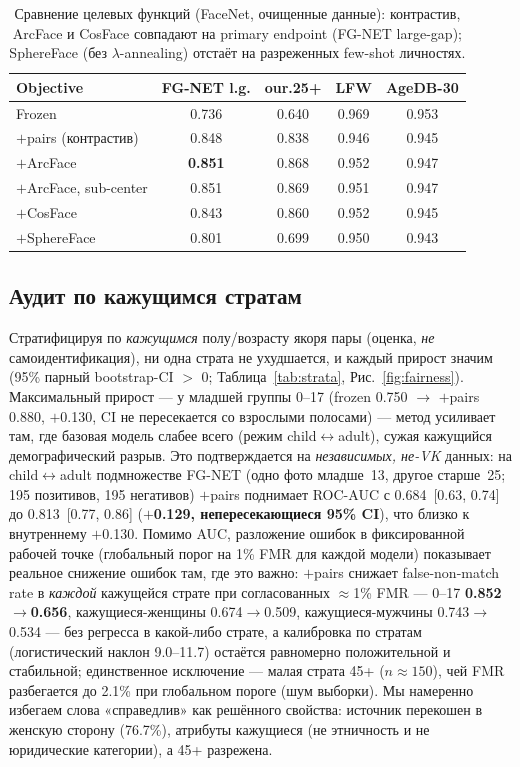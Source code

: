 \documentclass[journal]{IEEEtran}
\begin{document}
\begin{table}[!t]
\renewcommand{\arraystretch}{1.2}
\caption{Сравнение целевых функций (FaceNet, очищенные данные): контрастив, ArcFace и CosFace совпадают на primary endpoint (FG-NET large-gap); SphereFace (без $\lambda$-annealing) отстаёт на разреженных few-shot личностях.}
\label{tab:objective}
\centering
\footnotesize
\begin{tabular}{@{}lcccc@{}}
\toprule
Objective & FG-NET l.g. & our.25+ & LFW & AgeDB-30 \\
\midrule
Frozen & 0.736 & 0.640 & 0.969 & 0.953 \\
$+$pairs (контрастив) & 0.848 & 0.838 & 0.946 & 0.945 \\
$+$ArcFace & \textbf{0.851} & 0.868 & 0.952 & 0.947 \\
$+$ArcFace, sub-center & 0.851 & 0.869 & 0.951 & 0.947 \\
$+$CosFace & 0.843 & 0.860 & 0.952 & 0.945 \\
$+$SphereFace & 0.801 & 0.699 & 0.950 & 0.943 \\
\bottomrule
\end{tabular}
\end{table}

\subsection{Аудит по кажущимся стратам}\label{sec:res-fairness}
Стратифицируя по \emph{кажущимся} полу/возрасту якоря пары (оценка, \emph{не} самоидентификация), ни одна страта не ухудшается, и каждый прирост значим (95\% парный bootstrap-CI $>$ 0; Таблица~\ref{tab:strata}, Рис.~\ref{fig:fairness}). Максимальный прирост --- у младшей группы 0--17 (frozen 0.750 $\rightarrow$ $+$pairs 0.880, $+$0.130, CI не пересекается со взрослыми полосами) --- метод усиливает там, где базовая модель слабее всего (режим child$\leftrightarrow$adult), сужая кажущийся демографический разрыв. Это подтверждается на \emph{независимых, не-VK} данных: на child$\leftrightarrow$adult подмножестве FG-NET (одно фото младше~13, другое старше~25; 195 позитивов, 195 негативов) $+$pairs поднимает ROC-AUC с 0.684~[0.63, 0.74] до 0.813~[0.77, 0.86] (\textbf{$+$0.129, непересекающиеся 95\% CI}), что близко к внутреннему $+$0.130. Помимо AUC, разложение ошибок в фиксированной рабочей точке (глобальный порог на 1\% FMR для каждой модели) показывает реальное снижение ошибок там, где это важно: $+$pairs снижает false-non-match rate в \emph{каждой} кажущейся страте при согласованных $\approx$1\% FMR --- 0--17 \textbf{0.852$\rightarrow$0.656}, кажущиеся-женщины 0.674$\rightarrow$0.509, кажущиеся-мужчины 0.743$\rightarrow$0.534 --- без регресса в какой-либо страте, а калибровка по стратам (логистический наклон 9.0--11.7) остаётся равномерно положительной и стабильной; единственное исключение --- малая страта 45+ ($n{\approx}150$), чей FMR разбегается до 2.1\% при глобальном пороге (шум выборки). Мы намеренно избегаем слова «справедлив» как решённого свойства: источник перекошен в женскую сторону (76.7\%), атрибуты кажущиеся (не этничность и не юридические категории), а 45+ разрежена.
\end{document}

